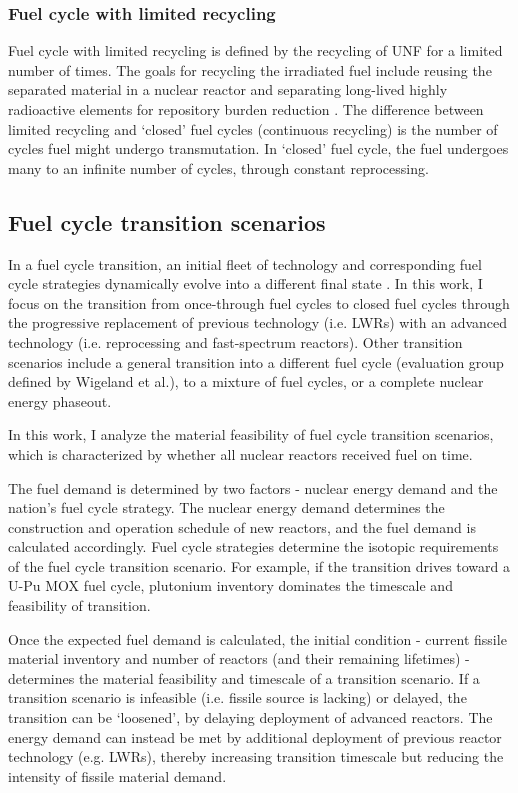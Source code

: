 \subsubsection{Fuel cycle with limited recycling}
Fuel cycle with limited recycling is defined by the recycling of \gls{UNF}
for a limited number of times. 
The goals for recycling the irradiated fuel include
reusing the separated material in a nuclear reactor and 
separating long-lived highly radioactive elements
for repository burden reduction \cite{wigeland_nuclear_2014}.
The difference
between limited recycling and `closed' fuel cycles (continuous
recycling) is the number of cycles fuel might undergo transmutation.
In `closed' fuel cycle, the fuel undergoes many to an infinite number
of cycles, through constant reprocessing.


\subsection{Fuel cycle transition scenarios}
In a fuel cycle transition, an initial fleet of technology and corresponding
fuel cycle strategies dynamically evolve into a different final state \cite{oecd_nuclear_2009}.
In this work, I focus on the transition from
once-through fuel cycles to closed fuel
cycles through the progressive replacement of previous technology
(i.e. \glspl{LWR}) with an advanced technology (i.e. reprocessing
and fast-spectrum reactors). Other transition scenarios include
a general transition into a different fuel cycle (evaluation group
defined by Wigeland et al.), to a mixture of fuel cycles, or
a complete nuclear energy phaseout.

In this work, I analyze the material feasibility of fuel
cycle transition scenarios, which is characterized by whether
all nuclear reactors received fuel on time.

The fuel demand is determined by two factors - nuclear energy demand
and the nation's fuel cycle strategy.
The nuclear energy demand determines the construction
and operation
schedule of new reactors, and the fuel demand is
calculated accordingly.
Fuel cycle strategies determine the isotopic
requirements of the fuel cycle transition scenario. For example,
if the transition drives toward a U-Pu \gls{MOX} fuel cycle,
plutonium inventory dominates the timescale and feasibility of transition.

Once the expected fuel demand is calculated,
the initial condition - current fissile material inventory
and number of reactors (and their remaining lifetimes) - determines
the material feasibility and timescale of a transition scenario.
If a transition scenario is infeasible (i.e. fissile source is lacking) or delayed,
the transition can be `loosened', by delaying deployment
of advanced reactors. The energy demand can instead be met by additional
deployment of previous reactor technology (e.g. \glspl{LWR}),
thereby increasing transition timescale but reducing the
intensity of fissile material demand.

